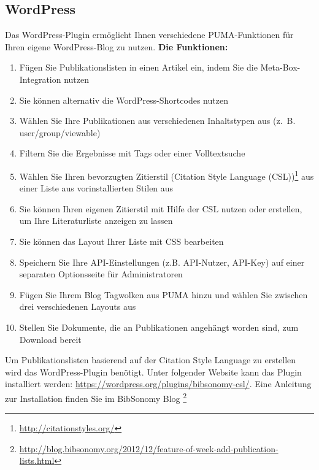 \subsection{WordPress}
\label{subsec:wordpress}
Das WordPress-Plugin ermöglicht Ihnen verschiedene PUMA-Funktionen für Ihren eigene WordPress-Blog zu nutzen.\newline\newline
\textbf{Die Funktionen:}
\begin{enumerate}
   \item Fügen Sie Publikationslisten in einen Artikel ein, indem Sie die Meta-Box-Integration nutzen
    \item Sie können alternativ die WordPress-Shortcodes nutzen
    \item Wählen Sie Ihre Publikationen aus verschiedenen Inhaltstypen aus (z.~B. user/group/viewable)
    \item Filtern Sie die Ergebnisse mit Tags oder einer Volltextsuche
    \item Wählen Sie Ihren bevorzugten Zitierstil (Citation Style Language (CSL))\footnote{\url{ http://citationstyles.org/}}  aus einer Liste aus vorinstallierten Stilen aus
    \item Sie können Ihren eigenen Zitierstil mit Hilfe der CSL nutzen oder erstellen, um Ihre Literaturliste anzeigen zu lassen
    \item Sie können das Layout Ihrer Liste mit CSS bearbeiten
    \item Speichern Sie Ihre API-Einstellungen (z.B. API-Nutzer, API-Key) auf einer separaten Optionsseite für Administratoren
    \item Fügen Sie Ihrem Blog Tagwolken aus PUMA hinzu und wählen Sie zwischen drei verschiedenen Layouts aus
    \item Stellen Sie Dokumente, die an Publikationen angehängt worden sind, zum Download bereit
\end{enumerate} 
Um Publikationslisten basierend auf der Citation Style Language zu erstellen wird das WordPress-Plugin benötigt. Unter folgender Website kann das Plugin installiert werden: \url{https://wordpress.org/plugins/bibsonomy-csl/}. Eine Anleitung zur Installation finden Sie im BibSonomy Blog \footnote{\url{http://blog.bibsonomy.org/2012/12/feature-of-week-add-publication-lists.html}}
